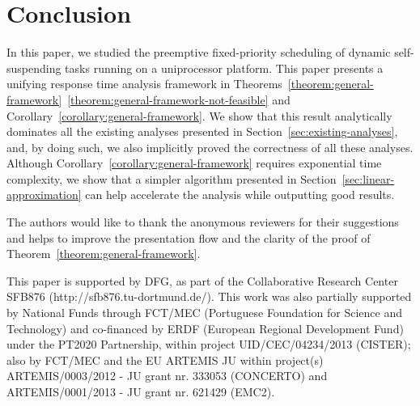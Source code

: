 \documentclass[conference]{IEEEtran}
\begin{document}
\section{Conclusion}
\label{sec:conclusion}


In this paper, we studied the preemptive fixed-priority scheduling of
dynamic self-suspending tasks running on a uniprocessor platform. This
paper presents a unifying response time analysis framework in
Theorems~\ref{theorem:general-framework}~\ref{theorem:general-framework-not-feasible} and
Corollary~\ref{corollary:general-framework}. We show that this result
analytically dominates all the existing analyses presented in
Section~\ref{sec:existing-analyses}, and, by doing such, we also implicitly
proved the correctness of all these analyses. Although
Corollary~\ref{corollary:general-framework} requires exponential time
complexity, we show that a simpler algorithm presented in Section~\ref{sec:linear-approximation} can help accelerate the analysis while outputting good results.


  The authors would like to thank the anonymous reviewers for their suggestions and helps to improve the presentation flow and the clarity of the proof of Theorem~\ref{theorem:general-framework}. 

This paper is supported by DFG, as part of the Collaborative Research Center SFB876 (http://sfb876.tu-dortmund.de/). This work was also partially supported by National Funds through FCT/MEC (Portuguese Foundation for Science and Technology) and co-financed by ERDF (European Regional Development Fund) under the PT2020 Partnership, within project UID/CEC/04234/2013 (CISTER); also by FCT/MEC and the EU ARTEMIS JU within project(s) ARTEMIS/0003/2012 - JU grant nr. 333053 (CONCERTO) and ARTEMIS/0001/2013 - JU grant nr. 621429 (EMC2).

{}

\end{document}
